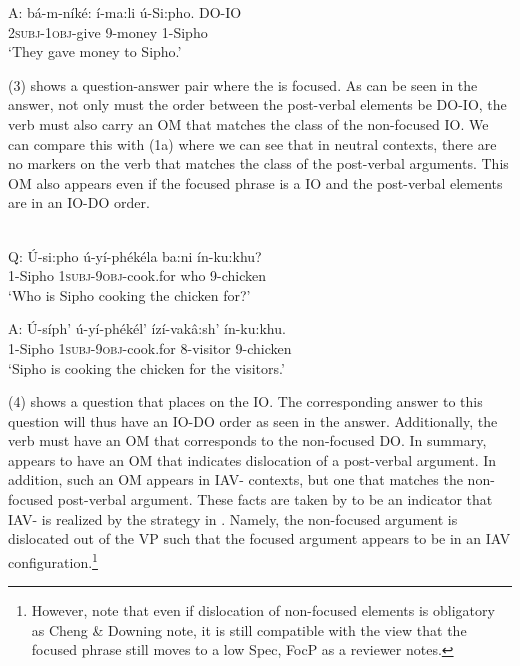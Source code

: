 \documentclass[output=paper,newtxmath,modfonts,nonflat,draft]{langsci/langscibook}
\begin{document}
A: \gll bá-m-níké:      í-ma:li   ú-Si:pho.     DO-IO\\
\textsc{2subj}{}-\textsc{1obj}{}-give   9-money   1-Sipho\\
\glt    \-\hspace{0.5cm}`They gave money to Sipho.’ 
\z

(3) shows a question-answer pair where the  is focused. As can be seen in the answer, not only must the order between the post-verbal elements be DO-IO, the verb must also carry an OM that matches the class of the non-focused IO. We can compare this with (1a) where we can see that in neutral contexts, there are no markers on the verb that matches the class of the post-verbal arguments. This OM also appears even if the focused phrase is a IO and the post-verbal elements are in an IO-DO order. 

\ea\label{ex:selvanathan:4}
 \citep[4]{chengdowning2012}\\
Q: \gll  Ú-si:pho    ú-yí-phékéla        ba:ni   ín-ku:khu?\\
1-Sipho       \textsc{1subj}{}-\textsc{9obj}{}-cook.for  who    9-chicken\\ 
\glt \-\hspace{0.5cm}`Who is Sipho cooking the chicken for?’

A: \gll  Ú-síph’   ú-yí-phékél’              ízí-vakâ:sh’    ín-ku:khu.\\
	1-Sipho  \textsc{1subj}{}-\textsc{9obj}{}-cook.for    8-visitor    9-chicken\\
\glt \-\hspace{0.5cm}`Sipho is cooking the chicken for the visitors.’
\z

(4) shows a question that places  on the IO. The corresponding answer to this question will thus have an IO-DO order as seen in the answer. Additionally, the verb must have an OM that corresponds to the non-focused DO. In summary,  appears to have an OM that indicates dislocation of a post-verbal argument. In addition, such an OM appears in IAV- contexts, but one that matches the non-focused post-verbal argument. These facts are taken by \citet{chengdowning2012} to be an indicator that  IAV- is realized by the strategy in . Namely, the non-focused argument is dislocated out of the VP such that the focused argument appears to be in an IAV configuration.\footnote{However, note that even if dislocation of non-focused elements is obligatory as Cheng \& Downing note, it is still compatible with the view that the focused phrase still moves to a low Spec, FocP as a reviewer notes.} 
\end{document}
